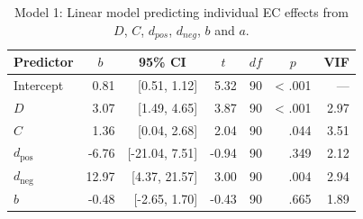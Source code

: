\documentclass[
  man,floatsintext]{apa6}
\begin{document}
\begin{table}[tbp]

\begin{center}
\begin{threeparttable}

\caption{\label{tab:unnamed-chunk-21}Model 1: Linear model predicting individual EC effects from $D$, $C$, $d_{pos}$, $d_{neg}$, $b$ and $a$.}

\begin{tabular}{lrrrrrr}
\toprule
Predictor & \multicolumn{1}{c}{$b$} & \multicolumn{1}{c}{95\% CI} & \multicolumn{1}{c}{$t$} & \multicolumn{1}{c}{$\mathit{df}$} & \multicolumn{1}{c}{$p$} & \multicolumn{1}{c}{VIF}\\
\midrule
Intercept & 0.81 & {}[0.51, 1.12] & 5.32 & 90 & < .001 & ---\\
$D$ & 3.07 & {}[1.49, 4.65] & 3.87 & 90 & < .001 & 2.97\\
$C$ & 1.36 & {}[0.04, 2.68] & 2.04 & 90 & .044 & 3.51\\
$d_{\mathrm{pos}}$ & -6.76 & {}[-21.04, 7.51] & -0.94 & 90 & .349 & 2.12\\
$d_{\mathrm{neg}}$ & 12.97 & {}[4.37, 21.57] & 3.00 & 90 & .004 & 2.94\\
$b$ & -0.48 & {}[-2.65, 1.70] & -0.43 & 90 & .665 & 1.89\\
\bottomrule
\end{tabular}

\end{threeparttable}
\end{center}

\end{table}
\end{document}
